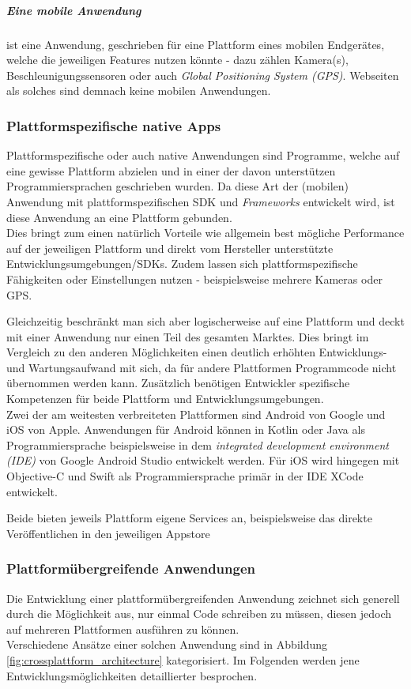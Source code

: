\subparagraph{Eine mobile Anwendung} ist eine Anwendung, geschrieben für eine Plattform eines mobilen Endgerätes, welche die jeweiligen Features nutzen könnte - dazu zählen Kamera(s), Beschleunigungssensoren oder auch \textit{Global Positioning System (GPS)}. Webseiten als solches sind demnach keine mobilen Anwendungen.


\subsubsection{Plattformspezifische native Apps}
Plattformspezifische oder auch native Anwendungen sind Programme, welche auf eine gewisse Plattform abzielen und in einer der davon unterstützen Programmiersprachen geschrieben wurden. Da diese Art der (mobilen) Anwendung mit plattformspezifischen  SDK und \textit{Frameworks} entwickelt wird, ist diese Anwendung an eine Plattform gebunden. \\
Dies bringt zum einen natürlich Vorteile wie allgemein best mögliche Performance auf der jeweiligen Plattform und direkt vom Hersteller unterstützte Entwicklungsumgebungen/SDKs.
Zudem lassen sich plattformspezifische Fähigkeiten oder Einstellungen nutzen - beispielsweise mehrere Kameras oder GPS.

Gleichzeitig beschränkt man sich aber logischerweise auf eine Plattform und deckt mit einer Anwendung nur einen Teil des gesamten Marktes. Dies bringt im Vergleich zu den anderen Möglichkeiten einen deutlich erhöhten Entwicklungs- und Wartungsaufwand mit sich, da für andere Plattformen Programmcode nicht übernommen werden kann. Zusätzlich benötigen Entwickler spezifische Kompetenzen für beide Plattform und Entwicklungsumgebungen. \\

Zwei der am weitesten verbreiteten Plattformen sind Android von Google und iOS von Apple. Anwendungen für Android können in Kotlin oder Java als Programmiersprache beispielsweise in dem \textit{integrated development environment (IDE)} von Google Android Studio entwickelt werden. Für iOS wird hingegen mit Objective-C und Swift als Programmiersprache primär in der IDE XCode entwickelt.

Beide bieten jeweils Plattform eigene Services an, beispielsweise das direkte Veröffentlichen in den jeweiligen Appstore \cite{fentaw2020}

\subsubsection{Plattformübergreifende Anwendungen}
\label{plattformuebergreifende_anwendungen}
Die Entwicklung einer plattformübergreifenden Anwendung zeichnet sich generell durch die Möglichkeit aus, nur einmal Code schreiben zu müssen, diesen jedoch auf mehreren Plattformen ausführen zu können. \\
Verschiedene Ansätze einer solchen Anwendung sind in Abbildung \ref{fig:crossplattform_architecture} kategorisiert. Im Folgenden werden jene Entwicklungsmöglichkeiten detaillierter besprochen.

